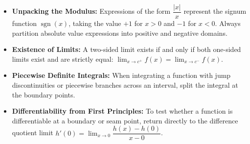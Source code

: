 \begin{takeaways}
\begin{itemize}[leftmargin=*]
    \item \textbf{Unpacking the Modulus:} Expressions of the form $\dfrac{|x|}{x}$ represent the signum function $\operatorname{sgn}(x)$, taking the value $+1$ for $x > 0$ and $-1$ for $x < 0$. Always partition absolute value expressions into positive and negative domains.
    \item \textbf{Existence of Limits:} A two-sided limit exists if and only if both one-sided limits exist and are strictly equal: $\lim_{x \to c^+} f(x) = \lim_{x \to c^-} f(x)$.
    \item \textbf{Piecewise Definite Integrals:} When integrating a function with jump discontinuities or piecewise branches across an interval, split the integral at the boundary points.
    \item \textbf{Differentiability from First Principles:} To test whether a function is differentiable at a boundary or seam point, return directly to the difference quotient limit $h'(0) = \lim_{x \to 0} \dfrac{h(x) - h(0)}{x - 0}$.
\end{itemize}
\end{takeaways}

